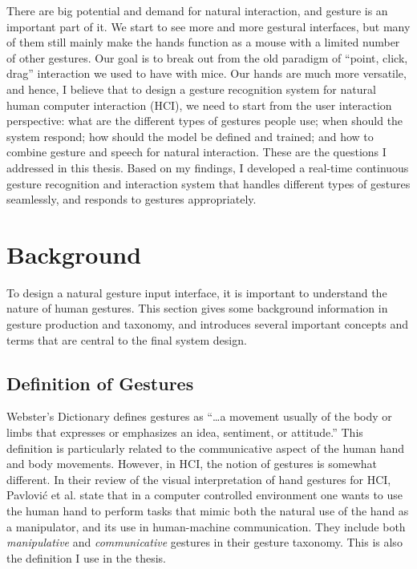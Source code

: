 There are big potential and demand for natural interaction, and gesture is
an important part of it. We start to see more and more gestural interfaces,
but many of them still mainly make the hands function as a mouse with a
limited number of other gestures. Our goal is to break out from the old
paradigm of ``point, click, drag'' interaction we used to have with mice. 
Our hands are much more versatile, and hence, I believe that to design a gesture
recognition system for natural human computer interaction (HCI), we need to
start from the user interaction perspective: what are the different types of
gestures people use; when should the system respond; how should the model be
defined and trained; and how to combine gesture and speech for natural
interaction. These are the questions I addressed in this thesis. Based on my
findings, I developed a real-time continuous gesture recognition and
interaction system that handles different types of gestures seamlessly, and
responds to gestures appropriately.

\section{Background}
To design a natural gesture input interface, it is important to understand the
nature of human gestures. This section gives some background information in
gesture production and taxonomy, and introduces several important concepts and
terms that are central to the final system design.
 
\subsection{Definition of Gestures}
Webster's Dictionary defines gestures as ``\ldots a movement usually of the body or limbs
that expresses or emphasizes an idea, sentiment, or attitude.'' This definition
is particularly related to the communicative aspect of the human hand and body
movements. However, in HCI, the notion
of gestures is somewhat different. In their review of the visual interpretation
of hand gestures for HCI, Pavlovi\'{c} et al. \cite{Pavlovic97} state that in a
computer controlled environment one wants to use the human hand to perform tasks that
mimic both the natural use of the hand as a manipulator, and its use in
human-machine communication. They include both \textit{manipulative} and
\textit{communicative} gestures in their gesture taxonomy. This is also the
definition I use in the thesis.

